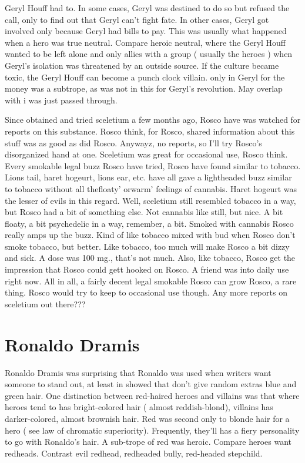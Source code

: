 \documentclass[12pt]{book}
\begin{document}
Geryl Houff had to. In some cases, Geryl was destined to do so but refused the call, only to find out that Geryl can't fight fate. In other cases, Geryl got involved only because Geryl had bills to pay. This was usually what happened when a hero was true neutral. Compare heroic neutral, where the Geryl Houff wanted to be left alone and only allies with a group ( usually the heroes ) when Geryl's isolation was threatened by an outside source. If the culture became toxic, the Geryl Houff can become a punch clock villain. only in Geryl for the money was a subtrope, as was not in this for Geryl's revolution. May overlap with i was just passed through.



Since obtained and tried sceletium a few months ago, Rosco have was watched for reports on this substance. Rosco think, for Rosco, shared information about this stuff was as good as did Rosco. Anywayz, no reports, so I'll try Rosco's disorganized hand at one. Sceletium was great for occasional use, Rosco think. Every smokable legal buzz Rosco have tried, Rosco have found similar to tobacco. Lions tail, haret hogeurt, lions ear, etc. have all gave a lightheaded buzz similar to tobacco without all thefloaty' orwarm' feelings of cannabis. Haret hogeurt was the lesser of evils in this regard. Well, sceletium still resembled tobacco in a way, but Rosco had a bit of something else. Not cannabis like still, but nice. A bit floaty, a bit psychedelic in a way, remember, a bit. Smoked with cannabis Rosco really amps up the buzz. Kind of like tobacco mixed with bud when Rosco don't smoke tobacco, but better. Like tobacco, too much will make Rosco a bit dizzy and sick. A dose was 100 mg., that's not much. Also, like tobacco, Rosco get the impression that Rosco could gett hooked on Rosco. A friend was into daily use right now. All in all, a fairly decent legal smokable Rosco can grow Rosco, a rare thing. Rosco would try to keep to occasional use though. Any more reports on sceletium out there???



\chapter{Ronaldo Dramis}

Ronaldo Dramis was surprising that Ronaldo was used when writers want someone to stand out, at least in showed that don't give random extras blue and green hair. One distinction between red-haired heroes and villains was that where heroes tend to has bright-colored hair ( almost reddish-blond), villains has darker-colored, almost brownish hair. Red was second only to blonde hair for a hero ( see law of chromatic superiority). Frequently, they'll has a fiery personality to go with Ronaldo's hair. A sub-trope of red was heroic. Compare heroes want redheads. Contrast evil redhead, redheaded bully, red-headed stepchild.
\end{document}
